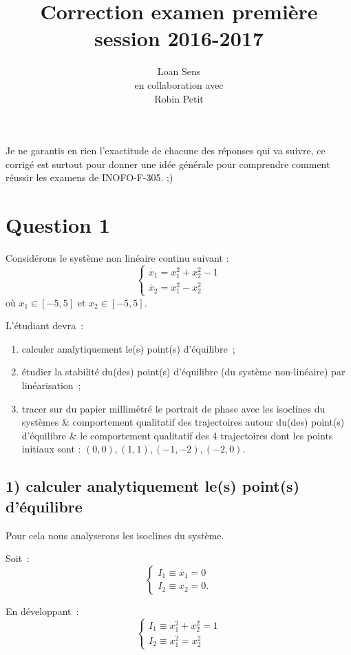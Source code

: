 \documentclass[11pt,a4paper]{report}
\title{Correction examen première session 2016-2017}
\author{Loan Sens\\ en collaboration avec\\Robin Petit}
\begin{document}
	\maketitle

	Je ne garantis en rien l'exactitude de chacune des réponses qui va suivre, ce corrigé est surtout pour donner une idée générale pour comprendre comment réussir les examens de INOFO-F-305. ;)

	\section*{Question 1}
		Considérons le système non linéaire continu suivant :
		\[
		\begin{cases}
			\dot{x_1} = x_1^2 + x_2^2 -1 \\
			\dot{x_2} = x_1^2 - x_2^2
		\end{cases}
		\]
		où $x_1 \in [-5, 5]$ et $x_2 \in [-5, 5]$.

		L'étudiant devra~:
		\begin{enumerate}
			\item calculer analytiquement le(s) point(s) d'équilibre~;
			\item étudier la stabilité du(des) point(s) d'équilibre (du système non-linéaire) par linéarisation~;
			\item tracer sur du papier millimétré le portrait de phase avec les isoclines du systèmes \& comportement qualitatif des trajectoires autour du(des) point(s) d'équilibre \& le comportement
			qualitatif des 4 trajectoires dont les points initiaux sont : $(0,0) , (1,1), (-1, -2), (-2,0)$.
		\end{enumerate}
		\pagebreak

		\subsection*{1) calculer analytiquement le(s) point(s) d'équilibre}
			Pour cela nous analyserons les isoclines du système.

			Soit~:
			\[
			\begin{cases}
				I_1 \equiv \dot{x_1} = 0 \\
				I_2 \equiv \dot{x_2} = 0.
			\end{cases}
			\]

			En développant~:
			\[
			\begin{cases}
				I_1 \equiv x_1^2 + x_2^2 = 1 \\
				I_2 \equiv x_1^2 = x_2^2
			\end{cases}
			\]
\end{document}
